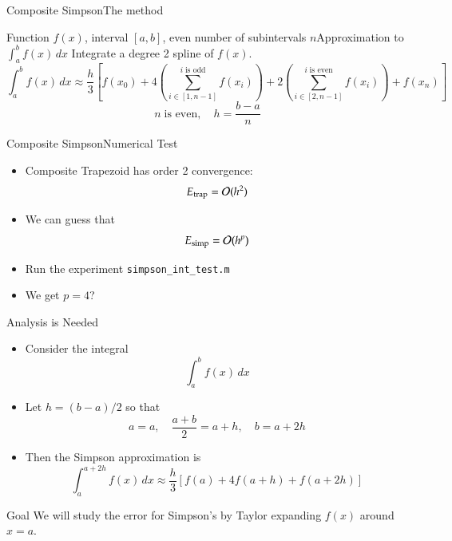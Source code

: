 \documentclass[10pt]{beamer}
\begin{document}
\begin{frame}[fragile]{Composite Simpson}{The method}

{Function $f(x)$, interval $[a,b]$, even number of subintervals $n$}{Approximation to $\int_a^b f(x) \,dx$}{
Integrate a degree 2 spline of $f(x)$.
}
    \begin{equation*}
    \int_{a}^{b} f(x)\,dx \approx \frac{h}{3}\left[f(x_0) + 4 \left(\sum_{i \in [1,n-1]}^{i\;\text{is odd}} f(x_i)\right) + 2\left(\sum_{i \in [2,n-1]}^{i\;\text{is even}}f(x_i)\right) + f(x_n) \right]
    \end{equation*}
    $$n\; \text{is even},\quad h = \frac{b-a}{n}$$
\end{frame}

\begin{frame}{Composite Simpson}{Numerical Test}

\begin{itemize}
    \item Composite Trapezoid has order 2 convergence: 
        $$E_{\text{trap}}= {\mathcal{O}}(h^2)$$

    \item We can guess that 
        $$E_{\text{simp}}= {\mathcal{O}}(h^p)$$
        
    \item Run the experiment \texttt{simpson\_int\_test.m}
        \vfill
    \item<2> We get $p=4$?
\end{itemize}

\end{frame}

\begin{frame}{Analysis is Needed}

\begin{itemize}
    \item Consider the integral
        $$
            \int_a^b f(x)\,dx 
        $$
    \item Let $h=(b-a)/2$ so that 
        $$
            a=a,\quad \frac{a+b}{2} = a+h,\quad b = a+2h
        $$
    \item Then the Simpson approximation is 
        $$
            \int_a^{a+2h} f(x)\,dx \approx \frac{h}{3}\left[f(a)+4f(a+h)+f(a+2h)\right]
        $$
    \end{itemize}

    \begin{block}{Goal}
        We will study the error for Simpson's by Taylor expanding $f(x)$ around $x=a$.
    \end{block}

    
\end{frame}
\end{document}
